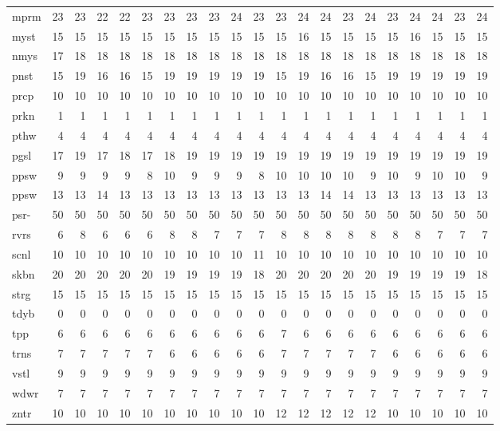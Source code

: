 \begin{center}
\begin{tabular}{lrrrrrrrrrrrrrrrrrrrr}
mprm & 23 & 23 & 22 & 22 & 23 & 23 & 23 & 23 & 24 & 23 & 23 & 24 & 24 & 23 & 24 & 23 & 24 & 24 & 23 & 24\\
myst & 15 & 15 & 15 & 15 & 15 & 15 & 15 & 15 & 15 & 15 & 15 & 16 & 15 & 15 & 15 & 15 & 16 & 15 & 15 & 15\\
nmys & 17 & 18 & 18 & 18 & 18 & 18 & 18 & 18 & 18 & 18 & 18 & 18 & 18 & 18 & 18 & 18 & 18 & 18 & 18 & 18\\
pnst & 15 & 19 & 16 & 16 & 15 & 19 & 19 & 19 & 19 & 19 & 15 & 19 & 16 & 16 & 15 & 19 & 19 & 19 & 19 & 19\\
prcp & 10 & 10 & 10 & 10 & 10 & 10 & 10 & 10 & 10 & 10 & 10 & 10 & 10 & 10 & 10 & 10 & 10 & 10 & 10 & 10\\
prkn & 1 & 1 & 1 & 1 & 1 & 1 & 1 & 1 & 1 & 1 & 1 & 1 & 1 & 1 & 1 & 1 & 1 & 1 & 1 & 1\\
pthw & 4 & 4 & 4 & 4 & 4 & 4 & 4 & 4 & 4 & 4 & 4 & 4 & 4 & 4 & 4 & 4 & 4 & 4 & 4 & 4\\
pgsl & 17 & 19 & 17 & 18 & 17 & 18 & 19 & 19 & 19 & 19 & 19 & 19 & 19 & 19 & 19 & 19 & 19 & 19 & 19 & 19\\
ppsw & 9 & 9 & 9 & 9 & 8 & 10 & 9 & 9 & 9 & 8 & 10 & 10 & 10 & 10 & 9 & 10 & 9 & 10 & 10 & 9\\
ppsw & 13 & 13 & 14 & 13 & 13 & 13 & 13 & 13 & 13 & 13 & 13 & 13 & 14 & 14 & 13 & 13 & 13 & 13 & 13 & 13\\
psr- & 50 & 50 & 50 & 50 & 50 & 50 & 50 & 50 & 50 & 50 & 50 & 50 & 50 & 50 & 50 & 50 & 50 & 50 & 50 & 50\\
rvrs & 6 & 8 & 6 & 6 & 6 & 8 & 8 & 7 & 7 & 7 & 8 & 8 & 8 & 8 & 8 & 8 & 8 & 7 & 7 & 7\\
scnl & 10 & 10 & 10 & 10 & 10 & 10 & 10 & 10 & 10 & 11 & 10 & 10 & 10 & 10 & 10 & 10 & 10 & 10 & 10 & 10\\
skbn & 20 & 20 & 20 & 20 & 20 & 19 & 19 & 19 & 19 & 18 & 20 & 20 & 20 & 20 & 20 & 19 & 19 & 19 & 19 & 18\\
strg & 15 & 15 & 15 & 15 & 15 & 15 & 15 & 15 & 15 & 15 & 15 & 15 & 15 & 15 & 15 & 15 & 15 & 15 & 15 & 15\\
tdyb & 0 & 0 & 0 & 0 & 0 & 0 & 0 & 0 & 0 & 0 & 0 & 0 & 0 & 0 & 0 & 0 & 0 & 0 & 0 & 0\\
tpp & 6 & 6 & 6 & 6 & 6 & 6 & 6 & 6 & 6 & 6 & 7 & 6 & 6 & 6 & 6 & 6 & 6 & 6 & 6 & 6\\
trns & 7 & 7 & 7 & 7 & 7 & 6 & 6 & 6 & 6 & 6 & 7 & 7 & 7 & 7 & 7 & 6 & 6 & 6 & 6 & 6\\
vstl & 9 & 9 & 9 & 9 & 9 & 9 & 9 & 9 & 9 & 9 & 9 & 9 & 9 & 9 & 9 & 9 & 9 & 9 & 9 & 9\\
wdwr & 7 & 7 & 7 & 7 & 7 & 7 & 7 & 7 & 7 & 7 & 7 & 7 & 7 & 7 & 7 & 7 & 7 & 7 & 7 & 7\\
zntr & 10 & 10 & 10 & 10 & 10 & 10 & 10 & 10 & 10 & 10 & 12 & 12 & 12 & 12 & 12 & 10 & 10 & 10 & 10 & 10\\
\end{tabular}
\end{center}
